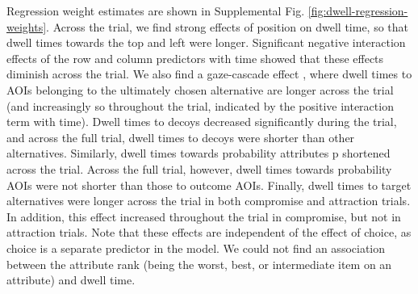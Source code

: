 \documentclass[11pt, a4paper]{article}
\begin{document}
\begin{refsection}
Regression weight estimates are shown in Supplemental Fig. \ref{fig:dwell-regression-weights}. Across the trial, we find strong effects of position on dwell time, so that dwell times towards the top and left were longer. Significant negative interaction effects of the row and column predictors with time showed that these effects diminish across the trial. We also find a gaze-cascade effect \autocite{mullett2016ImplicationsVisualAttention,shimojo2003GazeBiasBoth}, where dwell times to AOIs belonging to the ultimately chosen alternative are longer across the trial (and increasingly so throughout the trial, indicated by the positive interaction term with time). Dwell times to decoys decreased significantly during the trial, and across the full trial, dwell times to decoys were shorter than other alternatives. Similarly, dwell times towards probability attributes p shortened across the trial. Across the full trial, however, dwell times towards probability AOIs were not shorter than those to outcome AOIs. Finally, dwell times to target alternatives were longer across the trial in both compromise and attraction trials. In addition, this effect increased throughout the trial in compromise, but not in attraction trials. Note that these effects are independent of the effect of choice, as choice is a separate predictor in the model. We could not find an association between the attribute rank (being the worst, best, or intermediate item on an attribute) and dwell time.


\end{refsection}
\end{document}
